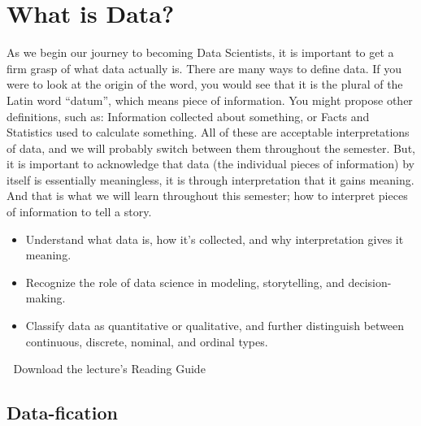 \documentclass[
  letterpaper,
  DIV=11,
  numbers=noendperiod]{scrreprt}
\providecommand{\tightlist}{%
  \setlength{\itemsep}{0pt}\setlength{\parskip}{0pt}}
\begin{document}

\chapter{What is Data?}\label{what-is-data}

As we begin our journey to becoming Data Scientists, it is important to
get a firm grasp of what data actually is. There are many ways to define
data. If you were to look at the origin of the word, you would see that
it is the plural of the Latin word ``datum'', which means piece of
information. You might propose other definitions, such as: Information
collected about something, or Facts and Statistics used to calculate
something. All of these are acceptable interpretations of data, and we
will probably switch between them throughout the semester. But, it is
important to acknowledge that data (the individual pieces of
information) by itself is essentially meaningless, it is through
interpretation that it gains meaning. And that is what we will learn
throughout this semester; how to interpret pieces of information to tell
a story.

\begin{itemize}
\tightlist
\item
  Understand what data is, how it's collected, and why interpretation
  gives it meaning.
\item
  Recognize the role of data science in modeling, storytelling, and
  decision-making.
\item
  Classify data as quantitative or qualitative, and further distinguish
  between continuous, discrete, nominal, and ordinal types.
\end{itemize}

\begin{tcolorbox}[enhanced jigsaw, colbacktitle=quarto-callout-tip-color!10!white, breakable, bottomrule=.15mm, colframe=quarto-callout-tip-color-frame, left=2mm, opacitybacktitle=0.6, title=\textcolor{quarto-callout-tip-color}{\faLightbulb}\hspace{0.5em}{Supplemental Material}, leftrule=.75mm, opacityback=0, rightrule=.15mm, titlerule=0mm, bottomtitle=1mm, colback=white, toprule=.15mm, arc=.35mm, toptitle=1mm, coltitle=black]

📄 Download the lecture's Reading Guide

\end{tcolorbox}

\section{Data-fication}\label{data-fication}
\end{document}
